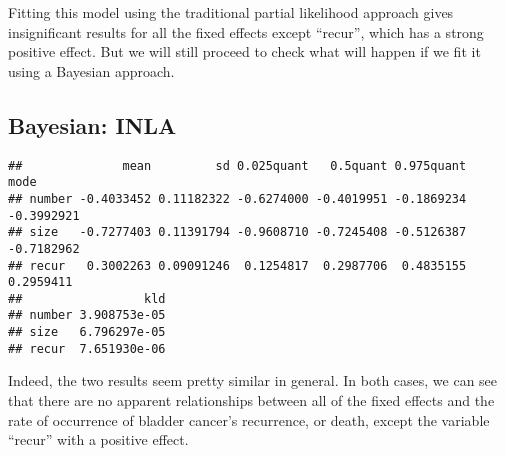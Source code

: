 \documentclass[]{article}
\newenvironment{Shaded}{\begin{snugshade}}{\end{snugshade}}
\newcommand{\DataTypeTok}[1]{\textcolor[rgb]{0.13,0.29,0.53}{#1}}
\newcommand{\DecValTok}[1]{\textcolor[rgb]{0.00,0.00,0.81}{#1}}
\newcommand{\KeywordTok}[1]{\textcolor[rgb]{0.13,0.29,0.53}{\textbf{#1}}}
\newcommand{\NormalTok}[1]{#1}
\newcommand{\OperatorTok}[1]{\textcolor[rgb]{0.81,0.36,0.00}{\textbf{#1}}}
\newcommand{\OtherTok}[1]{\textcolor[rgb]{0.56,0.35,0.01}{#1}}
\newcommand{\StringTok}[1]{\textcolor[rgb]{0.31,0.60,0.02}{#1}}
\begin{document}
Fitting this model using the traditional partial likelihood approach
gives insignificant results for all the fixed effects except ``recur'',
which has a strong positive effect. But we will still proceed to check
what will happen if we fit it using a Bayesian approach.

\hypertarget{bayesian-inla-1}{%
\subsection{Bayesian: INLA}\label{bayesian-inla-1}}

\begin{Shaded}
\end{Shaded}

\begin{verbatim}
##              mean         sd 0.025quant   0.5quant 0.975quant       mode
## number -0.4033452 0.11182322 -0.6274000 -0.4019951 -0.1869234 -0.3992921
## size   -0.7277403 0.11391794 -0.9608710 -0.7245408 -0.5126387 -0.7182962
## recur   0.3002263 0.09091246  0.1254817  0.2987706  0.4835155  0.2959411
##                 kld
## number 3.908753e-05
## size   6.796297e-05
## recur  7.651930e-06
\end{verbatim}

Indeed, the two results seem pretty similar in general. In both cases,
we can see that there are no apparent relationships between all of the
fixed effects and the rate of occurrence of bladder cancer's recurrence,
or death, except the variable ``recur'' with a positive effect.
\end{document}
